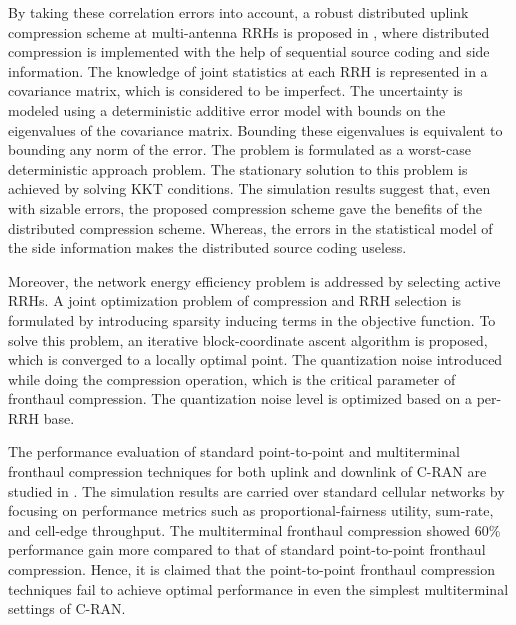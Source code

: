 \begin{multicols}{2}
\begin{itemize}
By taking these correlation errors into account, a robust distributed uplink compression scheme at multi-antenna RRHs is proposed in \cite{art3-key51}, where distributed compression is implemented with the help of sequential source coding and side information. The knowledge of joint statistics at each RRH is represented in a covariance matrix, which is considered to be imperfect. The uncertainty is modeled using a deterministic additive error model with bounds on the eigenvalues of the covariance matrix. Bounding these eigenvalues is equivalent to bounding any norm of the error. The problem is formulated as a worst-case deterministic approach problem. The stationary solution to this problem is achieved by solving KKT conditions. The simulation results suggest that, even with sizable errors, the proposed compression scheme gave the benefits of  the distributed compression scheme. Whereas, the errors in the
statistical model of the side information makes the distributed source coding useless.

Moreover, the network energy efficiency problem is addressed by selecting active RRHs. A joint optimization problem of compression and RRH selection is formulated by introducing sparsity inducing terms in the objective function. To solve this problem, an iterative block-coordinate ascent algorithm is proposed, which is converged to a locally optimal point. The quantization noise introduced while doing the compression operation, which is the critical parameter of fronthaul compression. The quantization noise level is optimized based on a per-RRH base.

The performance evaluation of standard point-to-point and multiterminal fronthaul compression techniques for both uplink and downlink of C-RAN are studied in \cite{art3-key52}. The simulation results are carried over standard cellular networks by focusing on performance metrics such as proportional-fairness utility, sum-rate, and cell-edge throughput. The multiterminal fronthaul compression showed 60\% performance gain more compared to that of standard point-to-point fronthaul compression. Hence, it is claimed that the point-to-point fronthaul compression techniques fail to achieve optimal performance in even the simplest multiterminal settings of C-RAN.


\end{itemize}
\end{multicols}
